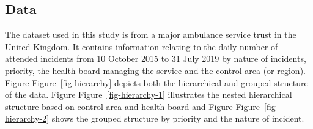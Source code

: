 \documentclass[
  authoryear,
  preprint,
  3p]{elsarticle}
\begin{document}
\hypertarget{sec-data}{%
\subsection{Data}\label{sec-data}}

The dataset used in this study is from a major ambulance service trust
in the United Kingdom. It contains information relating to the daily
number of attended incidents from 10 October 2015 to 31 July 2019 by
nature of incidents, priority, the health board managing the service and
the control area (or region). Figure Figure~\ref{fig-hierarchy} depicts
both the hierarchical and grouped structure of the data. Figure
Figure~\ref{fig-hierarchy-1} illustrates the nested hierarchical
structure based on control area and health board and Figure
Figure~\ref{fig-hierarchy-2} shows the grouped structure by priority and
the nature of incident.
\end{document}

